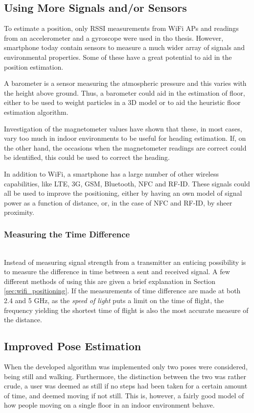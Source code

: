 \documentclass{LTHthesis}
\begin{document}
\subsection{Using More Signals and/or Sensors}
%
To estimate a position, only RSSI measurements from WiFi APs and readings from an accelerometer and a gyroscope were used in tho thesis. However, smartphone today contain sensors to measure a much wider array of signals and environmental properties. Some of these have a great potential to aid in the position estimation.

A barometer is a sensor measuring the atmospheric pressure and this varies with the height above ground. Thus, a barometer could aid in the estimation of floor, either to be used to weight particles in a 3D model or to aid the heuristic floor estimation algorithm.

Investigation of the magnetometer values have shown that these, in most cases, vary too much in indoor environments to be useful for heading estimation. If, on the other hand, the occasions when the magnetometer readings are correct could be identified, this could be used to correct the heading.

In addition to WiFi, a smartphone has a large number of other wireless capabilities, like LTE, 3G, GSM, Bluetooth, NFC and RF-ID. These signals could all be used to improve the positioning, either by having an own model of signal power as a function of distance, or, in the case of NFC and RF-ID, by sheer proximity.         

\subsubsection{Measuring the Time Difference}~\\
Instead of measuring signal strength from a transmitter an enticing possibility is to measure the difference in time between a sent and received signal. A few different methods of using this are given a brief explanation in Section \ref{sec:wifi_positioning}. If the measurements of time difference are made at both 2.4 and 5 GHz, as the \emph{speed of light} puts a limit on the time of flight, the frequency yielding the shortest time of flight is also the most accurate measure of the distance.   
%
\subsection{Improved Pose Estimation}
%
When the developed algorithm was implemented only two poses were considered, being still and walking. Furthermore, the distinction  between the two was rather crude, a user was deemed as still if no steps had been taken for a certain amount of time, and deemed moving if not still. This is, however, a fairly good model of how people moving on a single floor in an indoor environment behave. 
\end{document}
